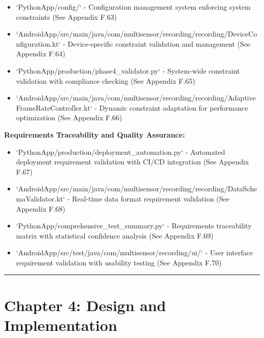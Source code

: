 \documentclass[11pt,a4paper]{report}
\begin{document}
\begin{itemize}
\item `PythonApp/config/` - Configuration management system enforcing system constraints (See Appendix F.63)
\item `AndroidApp/src/main/java/com/multisensor/recording/recording/DeviceConfiguration.kt` - Device-specific constraint
  validation and management (See Appendix F.64)
\item `PythonApp/production/phase4_validator.py` - System-wide constraint validation with compliance checking (See
  Appendix F.65)
\item `AndroidApp/src/main/java/com/multisensor/recording/recording/AdaptiveFrameRateController.kt` - Dynamic constraint
  adaptation for performance optimization (See Appendix F.66)

\end{itemize}
\textbf{Requirements Traceability and Quality Assurance:}

\begin{itemize}
\item `PythonApp/production/deployment_automation.py` - Automated deployment requirement validation with CI/CD
  integration (See Appendix F.67)
\item `AndroidApp/src/main/java/com/multisensor/recording/recording/DataSchemaValidator.kt` - Real-time data format
  requirement validation (See Appendix F.68)
\item `PythonApp/comprehensive_test_summary.py` - Requirements traceability matrix with statistical confidence analysis (See
  Appendix F.69)
\item `AndroidApp/src/test/java/com/multisensor/recording/ui/` - User interface requirement validation with usability
  testing (See Appendix F.70)

\end{itemize}
\hrule

\section{Chapter 4: Design and Implementation}
\end{document}
